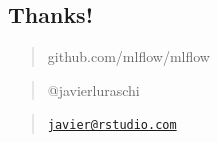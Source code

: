 \documentclass[]{article}
\begin{document}
\hypertarget{thanks}{%
\subsection{Thanks!}\label{thanks}}

\begin{quote}
github.com/mlflow/mlflow
\end{quote}

\begin{quote}
@javierluraschi
\end{quote}

\begin{quote}
\href{mailto:javier@rstudio.com}{\nolinkurl{javier@rstudio.com}}
\end{quote}
\end{document}

